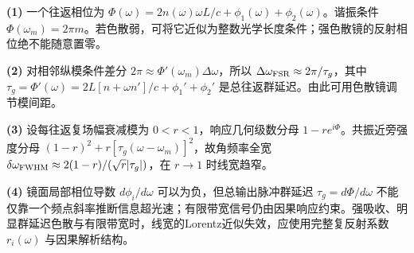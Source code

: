 \par\noindent\textbf{(1)} 一个往返相位为 \(\Phi(\omega)=2n(\omega)\omega L/c+\phi_1(\omega)+\phi_2(\omega)\)。谐振条件 \(\Phi(\omega_m)=2\pi m\)。若色散弱，可将它近似为整数光学长度条件；强色散镜的反射相位绝不能随意置零。
\par\noindent\textbf{(2)} 对相邻纵模条件差分 \(2\pi\approx\Phi'(\omega_m)\Delta\omega\)，所以 \(\Delta\omega_{\rm FSR}\approx2\pi/\tau_g\)，其中 \(\tau_g=\Phi'(\omega)=2L[n+\omega n']/c+\phi_1'+\phi_2'\) 是总往返群延迟。由此可用色散镜调节模间距。
\par\noindent\textbf{(3)} 设每往返复场幅衰减模为 \(0<r<1\)，响应几何级数分母 \(1-re^{i\Phi}\)。共振近旁强度分母 \((1-r)^2+r[\tau_g(\omega-\omega_m)]^2\)，故角频率全宽 \(\delta\omega_{\rm FWHM}\approx2(1-r)/(\sqrt r|\tau_g|)\)，在 \(r\to1\) 时线宽趋窄。
\par\noindent\textbf{(4)} 镜面局部相位导数 \(d\phi_i/d\omega\) 可以为负，但总输出脉冲群延迟 \(\tau_g=d\Phi/d\omega\) 不能仅靠一个频点斜率推断信息超光速；有限带宽信号仍由因果响应约束。强吸收、明显群延迟色散与有限带宽时，线宽的Lorentz近似失效，应使用完整复反射系数 \(r_i(\omega)\) 与因果解析结构。
